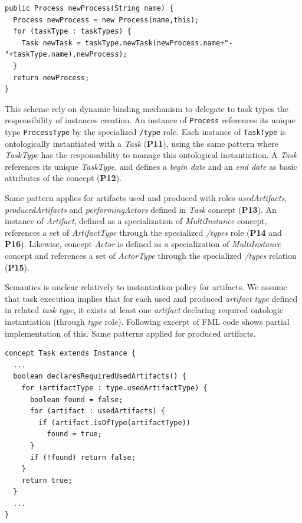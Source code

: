 \begin{lstlisting}
public Process newProcess(String name) {    
  Process newProcess = new Process(name,this);  
  for (taskType : taskTypes) {      
    Task newTask = taskType.newTask(newProcess.name+"-"+taskType.name),newProcess);        
  }      
  return newProcess;    
}    
\end{lstlisting}

This scheme rely on \FML dynamic binding mechanism to delegate to task types the responsibility of instances creation. An instance of \texttt{Process} references its unique type \texttt{ProcessType} by the specialized \texttt{/type} role. Each instance of \texttt{TaskType} is ontologically instantiated with a \textit{Task} (\textbf{P11}), using the same pattern where \textit{TaskType} has the responsability to manage this ontological instantiation. A \textit{Task} references its unique \textit{TaskType}, and defines a \textit{begin date} and an \textit{end date} as basic attributes of the concept (\textbf{P12}).

Same pattern applies for artifacts used and produced with roles \textit{usedArtifacts}, \textit{producedArtifacts} and \textit{performingActors} defined in \textit{Task} concept (\textbf{P13}). An instance of \textit{Artifact}, defined as a specialization of \textit{MultiInstance} concept, references a set of \textit{ArtifactType} through the specialized \textit{/types} role (\textbf{P14} and \textbf{P16}). Likewise, concept \textit{Actor} is defined as a specialization of \textit{MultiInstance} concept and references a set of \textit{ActorType} through the specialized \textit{/types} relation (\textbf{P15}).

Semantics is unclear relatively to instantiation policy for artifacts. We assume that task execution implies that for each used and produced \textit{artifact type} defined in related \textit{task type}, it exists at least one \textit{artifact} declaring required ontologic instantiation (through \textit{type} role). Following excerpt of FML code shows partial implementation of this. Same patterns applied for produced artifacts.

\begin{lstlisting}
concept Task extends Instance {
  ...
  boolean declaresRequiredUsedArtifacts() {
    for (artifactType : type.usedArtifactType) {
      boolean found = false;
      for (artifact : usedArtifacts) {
        if (artifact.isOfType(artifactType))
          found = true;
      }
      if (!found) return false;
    }
    return true;
  }
  ...
}    
\end{lstlisting}

